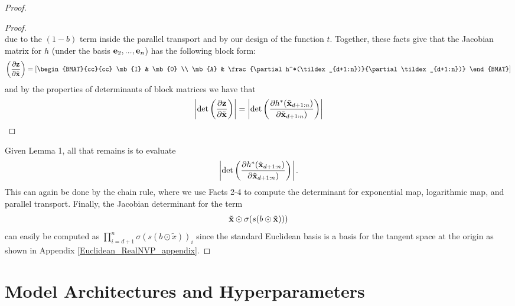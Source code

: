 \begin{proof}
\begin{proof}
\begin{equation}
\end{equation}
due to the $(1-b)$ term inside the parallel transport and by our design of the function $t$. 
Together, these facts give that the Jacobian matrix for $h$ (under the basis $\mathbf{e}_2, ..., \mathbf{e}_n$) has the following block form:
\begin{equation}
   \left(\frac{\partial \mb{z}}{\partial \tildex}\right) = \left[\begin{BMAT}{cc}{cc}
    \mb{I} & \mb{0} \\
    \mb{A} & \frac{\partial h^*(\tildex_{d+1:n})}{\partial \tildex_{d+1:n})}
    \end{BMAT}\right]
\end{equation}
and by the properties of determinants of block matrices we have that
\begin{equation}
    \left|\textnormal{det}\left(\frac{\partial \mathbf{z}}{\partial \tilde{\mathbf{x}}}\right)\right| =    \left|\textnormal{det}\left(\frac{\partial h^*(\tilde{\mathbf{x}}_{d+1:n})}{\partial \tilde{\mathbf{x}}_{d+1:n})}\right)\right|
\end{equation}
\end{proof}
Given Lemma 1, all that remains is to evaluate 
\begin{equation}
    \left|\textnormal{det}\left(\frac{\partial h^*(\tilde{\mathbf{x}}_{d+1:n})}{\partial \tilde{\mathbf{x}}_{d+1:n})}\right)\right|.
\end{equation}
This can again be done by the chain rule, where we use Facts 2-4 to compute the determinant for exponential map, logarithmic map, and parallel transport.
Finally, the Jacobian determinant for the term
\begin{equation}
    \tilde{\mathbf{x}} \odot \sigma(s(b \odot \tilde{\mathbf{x}})))
\end{equation}
can easily be computed as $\prod_{i=d+1}^n\sigma(s(b \odot \tilde{x}))_i$ since the standard Euclidean basis is a basis for the tangent space at the origin as shown in Appendix \ref{Euclidean_RealNVP_appendix}.
\end{proof}

\cut{}

\section{Model Architectures and Hyperparameters}
\label{model_arch_and_hyperparams}